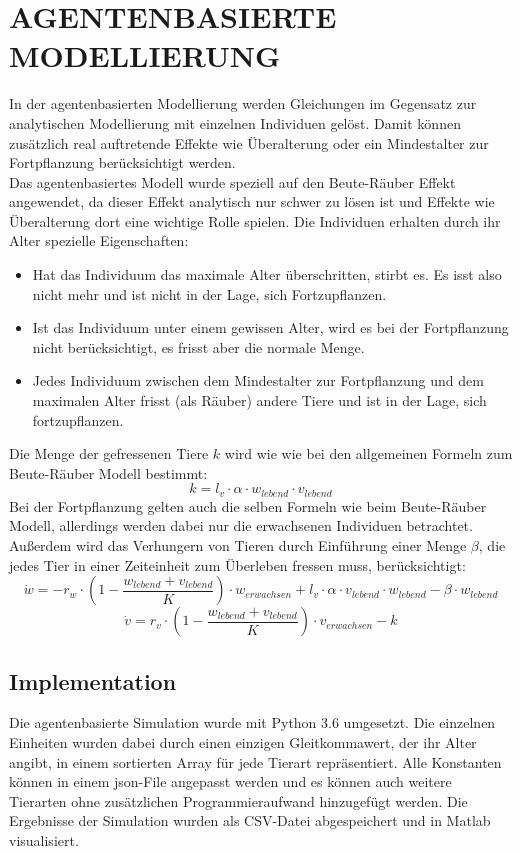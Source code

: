 \documentclass[a4paper,twoside]{article}
\begin{document}
	\newpage
	
	\section{\uppercase{Agentenbasierte Modellierung}}
	
	In der agentenbasierten Modellierung werden Gleichungen im Gegensatz zur analytischen Modellierung mit einzelnen Individuen gelöst.
	Damit können zusätzlich real auftretende Effekte wie Überalterung oder ein Mindestalter zur Fortpflanzung berücksichtigt werden.\\
	Das agentenbasiertes Modell wurde speziell auf den Beute-Räuber Effekt angewendet, da dieser Effekt analytisch nur schwer zu lösen ist und Effekte wie Überalterung dort eine wichtige Rolle spielen. Die Individuen erhalten durch ihr Alter spezielle Eigenschaften:
	\begin{itemize}
		\item Hat das Individuum das maximale Alter überschritten, stirbt es. Es isst also nicht mehr und ist nicht in der Lage, sich Fortzupflanzen.
		\item Ist das Individuum unter einem gewissen Alter, wird es bei der Fortpflanzung nicht berücksichtigt, es frisst aber die normale Menge.
		\item Jedes Individuum zwischen dem Mindestalter zur Fortpflanzung und dem maximalen Alter frisst (als Räuber) andere Tiere und ist in der Lage, sich fortzupflanzen.
	\end{itemize}
	Die Menge der gefressenen Tiere $k$ wird wie wie bei den allgemeinen Formeln zum Beute-Räuber Modell bestimmt:
	$$k = l_v\cdot \alpha \cdot w_{lebend} \cdot v_{lebend}$$
	Bei der Fortpflanzung gelten auch die selben Formeln wie beim Beute-Räuber Modell, allerdings werden dabei nur die erwachsenen Individuen betrachtet. Außerdem wird das Verhungern von Tieren durch Einführung einer Menge $\beta$, die jedes Tier in einer Zeiteinheit zum Überleben fressen muss, berücksichtigt:
	$$\dot{w} = -r_w \cdot \left(1-\frac{w_{lebend} + v_{lebend}}{K}\right)\cdot w_{erwachsen} + l_v\cdot \alpha \cdot v_{lebend}\cdot w_{lebend} - \beta \cdot w_{lebend}$$
	$$\dot{v} = r_v \cdot \left(1-\frac{w_{lebend} + v_{lebend}}{K}\right)\cdot v_{erwachsen} - k$$

	\subsection{Implementation}
	Die agentenbasierte Simulation wurde mit Python 3.6 umgesetzt. Die einzelnen Einheiten wurden dabei durch einen einzigen Gleitkommawert, der ihr Alter angibt, in einem sortierten Array für jede Tierart repräsentiert. Alle Konstanten können in einem json-File angepasst werden und es können auch weitere Tierarten ohne zusätzlichen Programmieraufwand hinzugefügt werden. Die Ergebnisse der Simulation wurden als CSV-Datei abgespeichert und in Matlab visualisiert.
	
\end{document}
